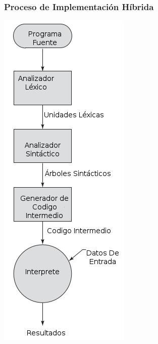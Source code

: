 \documentclass[11pt]{article}
\begin{document}
\subsubsection*{Proceso de Implementación Híbrida}
\label{sec:orgheadline24}

\includegraphics[width=.9\linewidth]{procesohibrido.png} 
\end{document}
